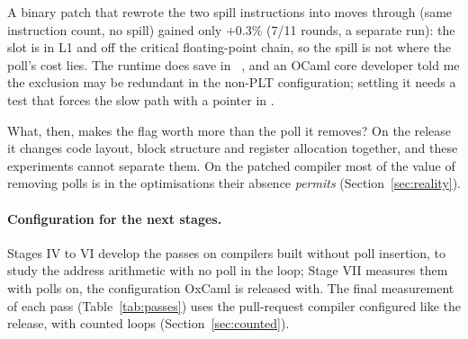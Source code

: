 A binary patch that rewrote the two spill instructions into moves through
 (same instruction count, no spill) gained only $+0.3\%$ (7/11
rounds, a separate run): the slot is in L1 and off the critical floating-point
chain, so the spill is not where the poll's cost lies. The runtime does save
 in ~\cite{ocaml_runtime}, and an OCaml core
developer told me the exclusion may be redundant in the non-PLT
configuration; settling it needs a test that forces the slow path with a
pointer in .

What, then, makes the flag worth more than the poll it removes? On the
release it changes code layout, block structure and register allocation
together, and these experiments cannot separate them. On the patched compiler
most of the value of removing polls is in the optimisations their absence
\emph{permits} (Section~\ref{sec:reality}).

\paragraph{Configuration for the next stages.} Stages IV to VI develop the
passes on compilers built without poll insertion, to study the address
arithmetic with no poll in the loop; Stage VII measures them with polls on,
the configuration OxCaml is released with. The final measurement of each pass
(Table~\ref{tab:passes}) uses the pull-request compiler configured like the
release, with counted loops (Section~\ref{sec:counted}).
